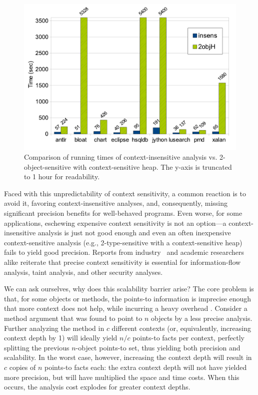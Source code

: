 \begin{figure}[hp]
\begin{center}
\hspace{-2mm}\includegraphics[scale=0.42]{assets/introspective/intro-chart.pdf}
\end{center}
\vspace{-0.6cm}
\caption{Comparison of running times of context-insensitive analysis vs. 2-object-sensitive with context-sensitive heap. The y-axis is truncated to 1 hour for readability.}
\label{fig:introspect:intro}
\end{figure}

Faced with this unpredictability of context sensitivity, a common reaction is to avoid it, favoring context-insensitive analyses, and, consequently, missing significant precision benefits for well-behaved programs. Even worse, for some applications, eschewing expensive context sensitivity is not an option---a context-insensitive analysis is just not good enough and even an often inexpensive context-sensitive analysis (e.g., 2-type-sensitive with a context-sensitive heap) fails to yield good precision. Reports from industry~\cite{misc:Cifuentes} and academic researchers~\cite{misc:Chong} alike reiterate that precise context sensitivity is essential for information-flow analysis, taint analysis, and other security analyses.

We can ask ourselves, why does this scalability barrier arise? The core problem is that, for some objects or methods, the points-to information is imprecise enough that more context does not help, while incurring a heavy overhead \cite{popl:2011:Smaragdakis}. Consider a method argument that was found to point to $n$ objects by a less precise analysis. Further analyzing the method in $c$ different contexts (or, equivalently, increasing context depth by 1) will ideally yield $n/c$ points-to facts per context, perfectly splitting the previous $n$-object points-to set, thus yielding both precision and scalability. In the worst case, however, increasing the context depth will result in $c$ copies of $n$ points-to facts each: the extra context depth will not have yielded more precision, but will have multiplied the space and time costs. When this occurs, the analysis cost explodes for greater context depths.

